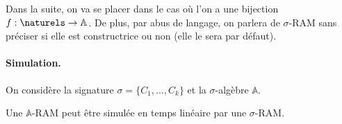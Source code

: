 \documentclass{report}
\newcommand{\bbA}{\mathbb{A}}
\begin{document}
				Dans la suite, on va se placer dans le cas où l'on a une bijection $f : \naturels \to \bbA$.
				De plus, par abus de langage, on parlera de $\sigma$-RAM sans préciser si elle est constructrice ou non (elle le sera par défaut). 

	
				
				\paragraph{Simulation.}
				\label{par:sim_A_RAM_sigma_RAM}
				On considère la signature $\sigma = \{C_1, \dots, C_k\}$ et la $\sigma$-algèbre $\bbA$.
				
				\begin{lemma}
					\label{lem:sim_A_RAM_sigma_RAM}
					Une $\bbA$-RAM peut être simulée en temps linéaire par une $\sigma$-RAM.
				\end{lemma}
				
\end{document}
